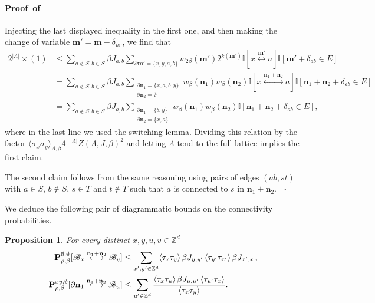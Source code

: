 \documentclass[a4paper,oneside,11pt]{article}
\def\Z{\mathbb{Z}}                          %
\newtheorem{proposition}[theorem]{Proposition}
\numberwithin{equation}{section}
\numberwithin{equation}{section}
\numberwithin{equation}{section}
\newenvironment{proof}[1][\relax]%
  {\paragraph{Proof\ifx#1\relax\else~of #1\fi}}%
  {~\hfill$\square$\par\bigskip}
\newcommand{\calB}{\mathcal{B}}
\def\Z{\mathbb{Z}}                          %
\newcommand{\n}{\mathbf{n}}
\newcommand{\m}{\mathbf m}
\begin{document}
\begin{proof}
\begin{itemize}[noitemsep]
\end{itemize}
Injecting the last displayed inequality in the first one, and then making the change of variable $\m'=\m-\delta_{uv}$, we find that 
\begin{align}2^{|\Lambda|}\times(1)&\le\sum_{a\notin S,b\in S}\beta J_{a,b}\sum_{\partial\m'=\{x,y,a,b\}}w_{2\beta}(\m')2^{k(\m')}\mathbb I[x\stackrel{\m'}\longleftrightarrow a]\mathbb  I[\m'+\delta_{ab}\in E]\nonumber\\
&=\sum_{a\notin S,b\in S}\beta J_{a,b}\sum_{\substack{\partial\n_1=\{x,a,b,y\}\\\partial\n_2=\emptyset}}w_{\beta}(\n_1)w_\beta(\n_2)\mathbb I[x\stackrel{\n_1+\n_2}\longleftrightarrow a]\mathbb  I[\n_1+\n_2+\delta_{ab}\in E]\nonumber\\
&=\sum_{a\notin S,b\in S}\beta J_{a,b}\sum_{\substack{\partial\n_1=\{b,y\}\\\partial\n_2=\{x,a\}}}w_{\beta}(\n_1)w_\beta(\n_2)\mathbb  I[\n_1+\n_2+\delta_{ab}\in E],
\end{align}
where in the last line we used the switching lemma. Dividing 
this relation by the factor
$\langle\sigma_x\sigma_y\rangle_{\Lambda,\beta} 4^{-|\Lambda|}Z(\Lambda,J,\beta)^2$ and letting $\Lambda$ tend to the full lattice implies the first claim.

The second claim follows from the same reasoning using pairs of edges $(ab,st)$ with $a\in S$, $b\notin S$, $s\in T$ and $t\notin T$ such that $a$ is connected to $s$ in $\n_1+\n_2$.
\end{proof}

We deduce the following pair of diagrammatic bounds on the connectivity probabilities. 

\begin{proposition}\label{prop:intersection phi4 upper}
For every distinct $x,y,u,v\in\Z^d$ 
\begin{align}
 {\bf P}^{\emptyset,\emptyset}_{\rho,\beta}[\calB_x\stackrel{\n_1+\n_2}{\longleftrightarrow} \calB_y]&\le\sum_{x',y'\in\Z^d}\langle\tau_x\tau_y\rangle\,\beta J_{y,y'}\,\langle\tau_{y'}\tau_{x'}\rangle\,\beta J_{x',x}\,
\label{eq:disconnect source phi4 sourceless},\\
{\bf P}^{xy,\emptyset}_{\rho,\beta}[\partial\n_1\stackrel{\n_1+\n_2}{\longleftrightarrow} \calB_u]&\le\sum_{u'\in\Z^d}\frac{\langle\tau_x\tau_u\rangle\,\beta J_{u,u'}\,\langle\tau_{u'}\tau_x\rangle}{\langle\tau_x\tau_y\rangle}\label{eq:disconnect source phi4}.
\end{align} 
\end{proposition}
\end{document}
